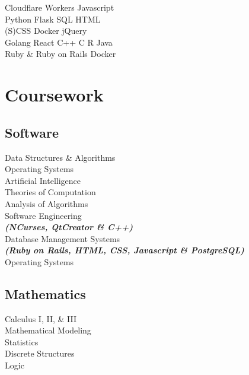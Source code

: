 \documentclass[letterpaper]{deedy-resume} %
\begin{document}
\begin{minipage}[t]{0.35\textwidth}
Cloudflare Workers \textbullet{} Javascript \\ Python \textbullet{} Flask \textbullet{} SQL \textbullet{} HTML \\ (S)CSS \textbullet{} Docker \textbullet{} jQuery \\
\sectionspace
{}
Golang \textbullet{} React \textbullet{} C++ \textbullet{} C \textbullet{} R \textbullet{} Java \\ Ruby \& Ruby on Rails \textbullet{} Docker \\

\sectionspace %


\section{Coursework}



\subsection{Software}

Data Structures \& Algorithms \\
Operating Systems \\
Artificial Intelligence \\
Theories of Computation \\
Analysis of Algorithms \\
Software Engineering \\
{\footnotesize \textit{\textbf{(NCurses, QtCreator \& C++) }}} \\
Database Management Systems \\
{\footnotesize \textit{\textbf{(Ruby on Rails, HTML, CSS, Javascript \& PostgreSQL) }}} \\
Operating Systems \\
 
\sectionspace

\subsection{Mathematics}
Calculus I, II, \& III \\
Mathematical Modeling \\
Statistics \\
Discrete Structures \\
Logic \\


\end{minipage}
\end{document}
